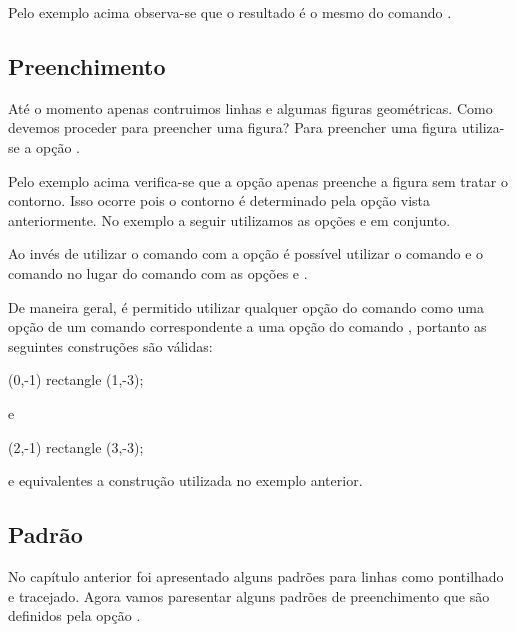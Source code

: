 
Pelo exemplo acima observa-se que o resultado \'{e} o mesmo do comando .

\subsection{Preenchimento}
At\'{e} o momento apenas contruimos linhas e algumas figuras geom\'{e}tricas. Como devemos proceder para preencher uma figura? Para preencher uma figura utiliza-se a op\c{c}\~{a}o .


Pelo exemplo acima verifica-se que a op\c{c}\~{a}o  apenas preenche a figura sem tratar o contorno. Isso ocorre pois o contorno \'{e} determinado pela op\c{c}\~{a}o  vista anteriormente. No exemplo a seguir utilizamos as op\c{c}\~{o}es  e  em conjunto. 


Ao inv\'{e}s de utilizar o comando  com a op\c{c}\~{a}o  \'{e} poss\'{i}vel utilizar o comando  e o comando  no lugar do comando  com as op\c{c}\~{o}es  e .

De maneira geral, \'{e} permitido utilizar qualquer op\c{c}\~{a}o do comando  como uma op\c{c}\~{a}o de um comando correspondente a uma op\c{c}\~{a}o do comando , portanto as seguintes constru\c{c}\~{o}es s\~{a}o v\'{a}lidas:
\begin{code}
    \fill[draw=red] (0,-1) rectangle (1,-3);
\end{code}
e
\begin{code}
    \draw[fill=blue] (2,-1) rectangle (3,-3);
\end{code}
e equivalentes a constru\c{c}\~{a}o utilizada no exemplo anterior.

\subsection{Padr\~{a}o}
No cap\'{i}tulo anterior foi apresentado alguns padr\~{o}es para linhas como pontilhado e tracejado. Agora vamos paresentar alguns padr\~{o}es de preenchimento que s\~{a}o definidos pela op\c{c}\~{a}o .

